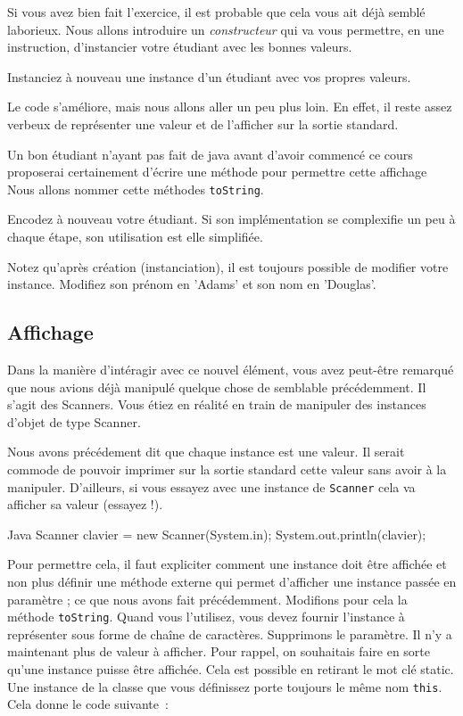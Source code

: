 \documentclass[a4paper,11pt]{article}
\begin{document}
	Si vous avez bien fait l'exercice, il est probable que cela vous ait déjà semblé laborieux. Nous allons introduire un \emph{constructeur} qui va vous permettre, en une instruction, d'instancier votre étudiant avec les bonnes valeurs.


	Instanciez à nouveau une instance d'un étudiant avec vos propres valeurs.

	Le code s'améliore, mais nous allons aller un peu plus loin. En effet, il reste assez verbeux de représenter une valeur et de l'afficher sur la sortie standard.

	Un bon étudiant n'ayant pas fait de java avant d'avoir commencé ce cours proposerai certainement d'écrire une méthode pour permettre cette affichage Nous allons nommer cette méthodes \texttt{toString}.


	Encodez à nouveau votre étudiant. Si son implémentation se complexifie un peu à chaque étape, son utilisation est elle simplifiée.

	Notez qu'après création (instanciation), il est toujours possible de modifier votre instance. Modifiez son prénom en 'Adams' et son nom en 'Douglas'.


	\subsection{Affichage}

	Dans la manière d'intéragir avec ce nouvel élément, vous avez peut-être remarqué que nous avions déjà manipulé quelque chose de semblable précédemment. Il s'agit des Scanners. Vous étiez en réalité en train de manipuler des instances d'objet de type Scanner.

	Nous avons précédement dit que chaque instance est une valeur. Il serait commode de pouvoir imprimer sur la sortie standard cette valeur sans avoir à la manipuler. D'ailleurs, si vous essayez avec une instance de \texttt{Scanner} cela va afficher sa valeur (essayez !).
	\begin{Code}{Java}
		Scanner clavier = new Scanner(System.in);
		System.out.println(clavier);
	\end{Code}

	Pour permettre cela, il faut expliciter comment une instance doit être affichée et non plus définir une méthode externe qui permet d'afficher une instance passée en paramètre ; ce que nous avons fait précédemment. Modifions pour cela la méthode \texttt{toString}. Quand vous l'utilisez, vous devez fournir l'instance à représenter sous forme de chaîne de caractères. Supprimons le paramètre. Il n'y a maintenant plus de valeur à afficher. Pour rappel, on souhaitais faire en sorte qu'une instance puisse être affichée. Cela est possible en retirant le mot clé static. Une instance de la classe que vous définissez porte toujours le même nom \texttt{this}. Cela donne le code suivante~:
\end{document}

